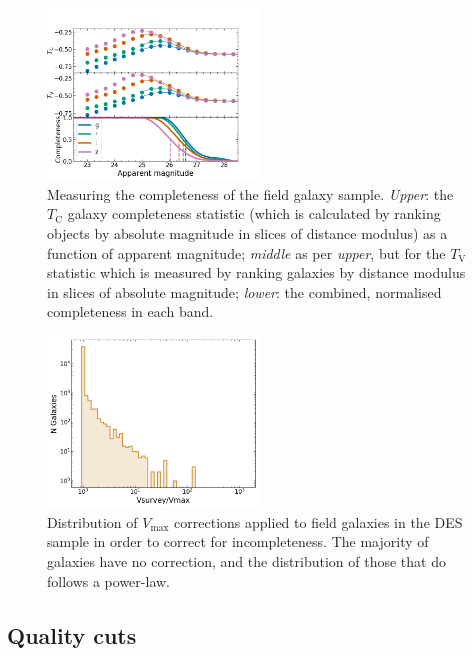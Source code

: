 \documentclass[fleqn,usenatbib]{mnras}
\providecommand{\DIFaddendFL}{} %
\DeclareRobustCommand{\DIFaddendFL}{\DIFOaddendFL \let\includegraphics\DIFOincludegraphics} %
\begin{document}
\begin{figure}
    \centering
    \DIFaddendFL \includegraphics[width=0.5\textwidth]{figs/completeness_combined.png}
    \caption{Measuring the completeness of the field galaxy sample. \textit{Upper}: the $T_{\mathrm{C}}$ galaxy completeness statistic (which is calculated by ranking objects by absolute magnitude in slices of distance modulus) as a function of apparent magnitude; \textit{middle} as per \textit{upper}, but for the $T_{\mathrm{V}}$ statistic which is measured by ranking galaxies by distance modulus in slices of absolute magnitude; \textit{lower}: the combined, normalised completeness in each band.  
    \label{fig:completeness}}
\end{figure}

\begin{figure}
    \centering
    \includegraphics[width=0.5\textwidth]{figs/field_vmax.png}
    \caption{Distribution of $V_{\mathrm{max}}$ corrections applied to field galaxies in the DES sample in order to correct for incompleteness. The majority of galaxies have no correction, and the distribution of those that do follows a power-law.
    \label{fig:vmax_field}}
\end{figure}

\subsection{Quality cuts \label{subsec:cuts}}
\end{document}
